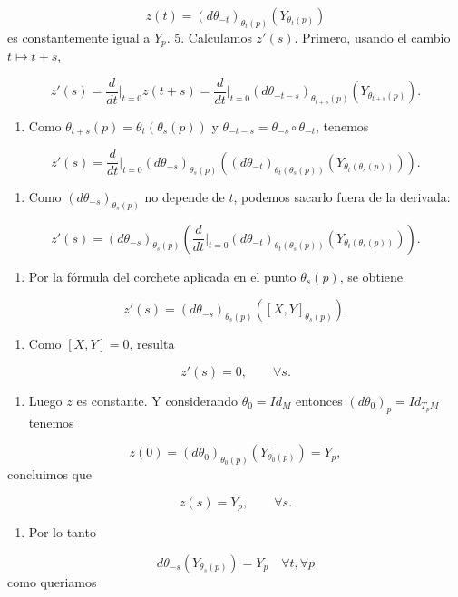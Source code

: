 \begin{bookproof}{}
\[
z(t)=(d\theta_{-t})_{\theta_{t}(p)}\left(Y_{\theta_t(p)}\right)
\]
es constantemente igual a $Y_p$. 5. Calculamos $z'(s)$. Primero, usando el cambio $t\mapsto t+s$,

\[
z'(s)=\frac{d}{dt}\bigg|_{t=0}z(t+s)=\frac{d}{dt}\bigg|_{t=0}(d\theta_{-t-s})_{\theta_{t+s}(p)}\left(Y_{\theta_{t+s}(p)}\right).
\]
\begin{enumerate}[start=6]
\item Como $\theta_{t+s}(p)=\theta_t(\theta_s(p))$ y $\theta_{-t-s}=\theta_{-s}\circ\theta_{-t}$, tenemos
\end{enumerate}
\[
z'(s)=\frac{d}{dt}\bigg|_{t=0}(d\theta_{-s})_{\theta_s(p)}\left((d\theta_{-t})_{\theta_{t}(\theta_{s}(p))}\left(Y_{\theta_t(\theta_s(p))}\right)\right).
\]
\begin{enumerate}[start=7]
\item Como $(d\theta_{-s})_{\theta_s(p)}$ no depende de $t$, podemos sacarlo fuera de la derivada:
\end{enumerate}
\[
z'(s)=(d\theta_{-s})_{\theta_s(p)}\left(\frac{d}{dt}\bigg|_{t=0}(d\theta_{-t})_{\theta_{t}(\theta_{s}(p))}\left(Y_{\theta_t(\theta_s(p))}\right)\right).
\]
\begin{enumerate}[start=8]
\item Por la fórmula del corchete aplicada en el punto $\theta_s(p)$, se obtiene
\end{enumerate}
\[
z'(s)=(d\theta_{-s})_{\theta_s(p)}\left([X,Y]_{\theta_s(p)}\right).
\]
\begin{enumerate}[start=9]
\item Como $[X,Y]=0$, resulta
\end{enumerate}
\[
z'(s)=0,\qquad \forall s.
\]
\begin{enumerate}[start=10]
\item Luego $z$ es constante. Y considerando $\theta_{0}=Id_{M}$ entonces $(d\theta_{0})_{p}=Id_{T_{p}M}$ tenemos
\end{enumerate}
\[
z(0)=(d\theta_0)_{\theta_{0}(p)}(Y_{\theta_0(p)})=Y_p,
\]
concluimos que

\[
z(s)=Y_p,\qquad \forall s.
\]
\begin{enumerate}[start=11]
\item Por lo tanto
\end{enumerate}
\[
d\theta_{-s}\left(Y_{\theta_s(p)}\right)=Y_p\quad\forall t,\forall p
\]
como queriamos


\end{bookproof}
